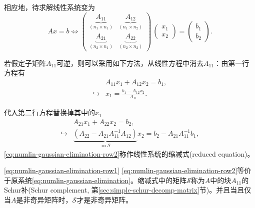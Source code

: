 相应地，待求解线性系统变为
\begin{equation}
  \label{eq:numlin-gaussian-elimination}
  A x = b \Longleftrightarrow
  \begin{pmatrix}
    \underbrace{A_{11}}_{\left( n_{1} \times n_{1} \right)} &
    \underbrace{A_{12}}_{\left( n_{1} \times n_{2} \right)} \\
    \underbrace{A_{21}}_{\left( n_{2} \times n_{1} \right)}&
    \underbrace{A_{22}}_{\left( n_{2} \times n_{2} \right)}
  \end{pmatrix}
  \,
  \begin{pmatrix}
    x_{1} \\ x_{2}
  \end{pmatrix}
  =
  \begin{pmatrix}
      b_{1} \\
      b_{2}
  \end{pmatrix}.
\end{equation}

若假定子矩阵$A_{11}$可逆，则可以采用如下方法，从线性方程中消去$A_{11}$：由第一行方程有
\begin{equation}
  \label{eq:numlin-gaussian-elimination-row1}
  \begin{split}
    & A_{11} x_{1} + A_{12} x_{2} = b_{1}, \\
    \hookrightarrow & x_{1} = \frac{b_{1} - A_{12} x_{2}}{A_{11}}.
  \end{split}
\end{equation}

代入第二行方程替换掉其中的$x_{1}$
\begin{equation}
  \label{eq:numlin-gaussian-elimination-row2}
  \begin{split}
    & A_{21} x_{1} + A_{22} x_{2} = b_{2}, \\
    \hookrightarrow &
    \underbrace{
    \left( A_{22} - A_{21} A_{11}^{-1} A_{12} \right)
    }_{\eqqcolon \mathcal{S}}
    x_{2} = b_{2} - A_{21}A_{11}^{-1} b_{1},
  \end{split}
\end{equation}
\eqref{eq:numlin-gaussian-elimination-row2}称作线性系统的缩减式(reduced equation)。

\eqref{eq:numlin-gaussian-elimination-row1} \eqref{eq:numlin-gaussian-elimination-row2}等价于原系统\eqref{eq:numlin-gaussian-elimination}。缩减式中的矩阵$\mathcal{S}$称为$A$中的块$A_{11}$的Schur补(Schur complement, 第\ref{sec:simple-schur-decomp-matrix}节)。并且当且仅当$A$是非奇异矩阵时，$\mathcal{S}$才是非奇异矩阵。

